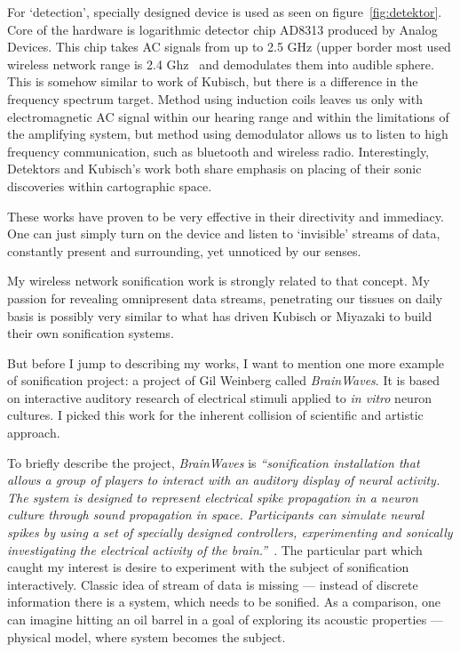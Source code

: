 \documentclass[12pt,a4paper,oneside]{report}
\begin{document}
For `detection', specially designed device is used as seen on figure~\ref{fig:detektor}. Core of the hardware is logarithmic detector chip AD8313 produced by Analog Devices. This chip takes AC signals from up to 2.5 GHz  (upper border most used wireless network range is 2.4 Ghz~\cite{802} and demodulates them into audible sphere. This is somehow similar to work of Kubisch, but there is a difference in the frequency spectrum target. Method using induction coils leaves us only with electromagnetic AC signal within our hearing range and within the limitations of the amplifying system, but method using demodulator allows us to listen to high frequency communication, such as bluetooth and wireless radio. Interestingly, Detektors and Kubisch's work both share emphasis on placing of their sonic discoveries within cartographic space.

These works have proven to be very effective in their directivity and immediacy. One can just simply turn on the device and listen to `invisible' streams of data, constantly present and surrounding, yet unnoticed by our senses. 

My wireless network sonification work is strongly related to that concept. My passion for revealing omnipresent data streams, penetrating our tissues on daily basis is possibly very similar to what has driven Kubisch or Miyazaki to build their own sonification systems.  

But before I jump to describing my works, I want to mention one more example of sonification project: a project of Gil Weinberg called \emph{BrainWaves}. It is based on interactive auditory research of electrical stimuli applied to \emph{in vitro} neuron cultures. I picked this work for the inherent collision of scientific and artistic approach.

To briefly describe the project, \emph{BrainWaves} is \emph{``sonification installation that allows a group of players to interact with an auditory display of neural activity. The system is designed to represent electrical spike propagation in a neuron culture through sound propagation in space. Participants can simulate neural spikes by using a set of specially designed controllers, experimenting and sonically investigating the electrical activity of the brain.''}~\cite[p.~9]{Weinberg2006}. The particular part which caught my interest is desire to experiment with the subject of sonification interactively. Classic idea of stream of data is missing --- instead of discrete information there is a system, which needs to be sonified. As a comparison, one can imagine hitting an oil barrel in a goal of exploring its acoustic properties --- physical model, where system becomes the subject.
\end{document}
